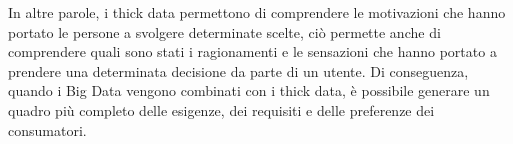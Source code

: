 In altre parole, i thick data permettono di comprendere le motivazioni che hanno portato le persone a svolgere determinate scelte, ciò permette anche di comprendere quali sono stati i ragionamenti e le sensazioni che hanno portato a prendere una determinata decisione da parte di un utente. Di conseguenza, quando i Big Data vengono combinati con i thick data, è possibile generare un quadro più completo delle esigenze, dei requisiti e delle preferenze dei consumatori.

